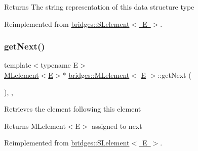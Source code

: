 \begin{DoxyReturn}{Returns}
The string representation of this data structure type 
\end{DoxyReturn}


Reimplemented from \mbox{\hyperlink{classbridges_1_1_s_lelement_a136330b3481a47b3edb429f323274655}{bridges\+::\+S\+Lelement$<$ E $>$}}.

\mbox{\label{classbridges_1_1_m_lelement_aceebd292e7d497f44eea5c4845e7709f}} 
\subsubsection{\texorpdfstring{getNext()}{getNext()}\hspace{0.1cm}{\footnotesize\ttfamily [1/2]}}
{\footnotesize\ttfamily template$<$typename E$>$ \\
\mbox{\hyperlink{classbridges_1_1_m_lelement}{M\+Lelement}}$<$\mbox{\hyperlink{namespacebridges_acfb0a4f7877d8f63de3e6862004c50eda3a3ea00cfc35332cedf6e5e9a32e94da}{E}}$>$$\ast$ \mbox{\hyperlink{classbridges_1_1_m_lelement}{bridges\+::\+M\+Lelement}}$<$ \mbox{\hyperlink{namespacebridges_acfb0a4f7877d8f63de3e6862004c50eda3a3ea00cfc35332cedf6e5e9a32e94da}{E}} $>$\+::get\+Next (\begin{DoxyParamCaption}{ }\end{DoxyParamCaption})\hspace{0.3cm}{\ttfamily [inline]}, {\ttfamily [override]}, {\ttfamily [virtual]}}

Retrieves the element following this element

\begin{DoxyReturn}{Returns}
M\+Lelement$<$\+E$>$ assigned to next 
\end{DoxyReturn}


Reimplemented from \mbox{\hyperlink{classbridges_1_1_s_lelement_a5bd74108a9aa49339378bf62cdbb19ca}{bridges\+::\+S\+Lelement$<$ E $>$}}.

\mbox{\label{classbridges_1_1_m_lelement_aef3e5750e334331597bce94710745d1e}} 

